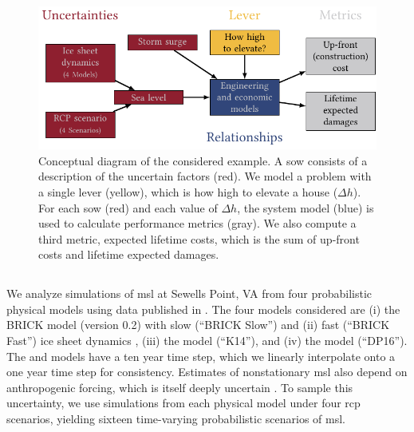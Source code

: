 \documentclass{agujournal2019}
\begin{document}
\begin{figure}
  \centering
  \includegraphics[width=\textwidth]{xlrm.pdf}
  \caption{
    Conceptual diagram of the considered example.
    A \acrfull{sow} consists of a description of the uncertain factors (red).
    We model a problem with a single lever (yellow), which is how high to elevate a house ($\Delta h$).
    For each \acrshort{sow} (red) and each value of $\Delta h$, the system model (blue) is used to calculate performance metrics (gray).
    We also compute a third metric, expected lifetime costs, which is the sum of up-front costs and lifetime expected damages.
  }\label{fig:xlrm}
\end{figure}

\subsection{}\label{sec:case-slr}

We analyze simulations of \gls{msl} at Sewells Point, VA from four probabilistic physical models using data published in .
The four models considered are (i) the BRICK model (version 0.2) with slow (``BRICK Slow'') and (ii) fast (``BRICK Fast'') ice sheet dynamics \cite{wong_brick0.2:2017}, (iii) the  model (``K14''), and (iv) the  model (``DP16'').
The  and  models have a ten year time step, which we linearly interpolate onto a one year time step for consistency.
Estimates of nonstationary \gls{msl} also depend on anthropogenic forcing, which is itself deeply uncertain \cite{ho_scenarios:2019,srikrishnan_probabilistic:2022}.
To sample this uncertainty, we use simulations from each physical model under four \gls{rcp} scenarios, yielding sixteen time-varying probabilistic scenarios of \gls{msl}.
\end{document}
